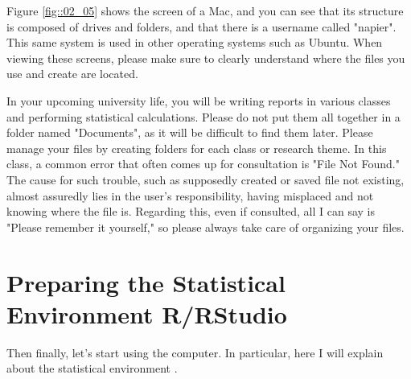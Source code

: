 \documentclass{ltjsbook}
\begin{document}

Figure \ref{fig::02_05} shows the screen of a Mac, and you can see that its structure is composed of drives and folders, and that there is a username called "napier". This same system is used in other operating systems such as Ubuntu. When viewing these screens, please make sure to clearly understand where the files you use and create are located.


In your upcoming university life, you will be writing reports in various classes and performing statistical calculations.
Please do not put them all together in a folder named "Documents", as it will be difficult to find them later. Please manage your files by creating folders for each class or research theme.
In this class, a common error that often comes up for consultation is "File Not Found." The cause for such trouble, such as supposedly created or saved file not existing, almost assuredly lies in the user's responsibility, having misplaced and not knowing where the file is. Regarding this, even if consulted, all I can say is "Please remember it yourself," so please always take care of organizing your files.

\section{Preparing the Statistical Environment R/RStudio}
Then finally, let's start using the computer. In particular, here I will explain about the statistical environment .
\end{document}
